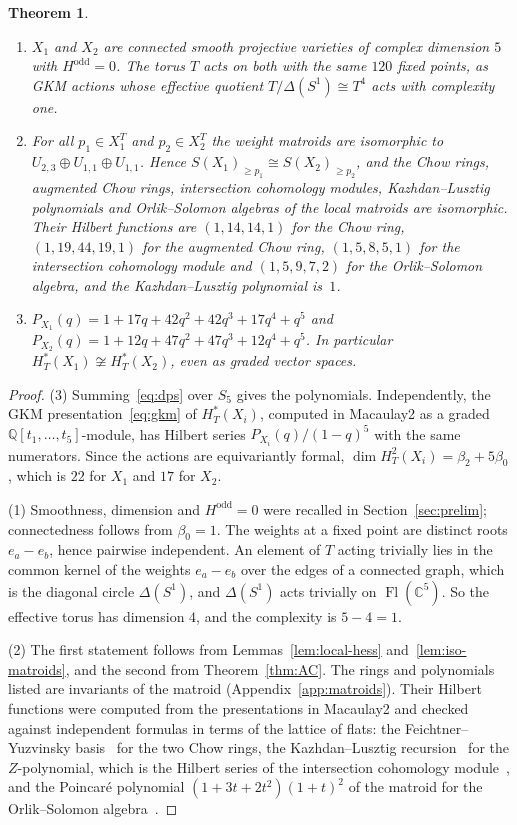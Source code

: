 \documentclass[11pt,a4paper]{article}
\numberwithin{equation}{section}
\theoremstyle{plain}
\newtheorem{theorem}{Theorem}[section]
\theoremstyle{definition}
\theoremstyle{remark}
\newcommand{\Q}{\mathbb{Q}}
\newcommand{\C}{\mathbb{C}}
\newcommand{\HT}{H^{*}_{T}}
\DeclareMathOperator{\Fl}{Fl}
\begin{document}
\begin{theorem}\label{thm:counterexample}
\begin{enumerate}[nosep,label=(\arabic*)]
\item $X_1$ and $X_2$ are connected smooth projective varieties of complex dimension $5$ with $H^{\mathrm{odd}}=0$. The torus $T$ acts on both with the same $120$ fixed points, as GKM actions whose effective quotient $T/\Delta(S^1)\cong T^4$ acts with complexity one.
\item For all $p_1\in X_1^T$ and $p_2\in X_2^T$ the weight matroids are isomorphic to $U_{2,3}\oplus U_{1,1}\oplus U_{1,1}$. Hence $S(X_1)_{\geqslant p_1}\cong S(X_2)_{\geqslant p_2}$, and the Chow rings, augmented Chow rings, intersection cohomology modules, Kazhdan--Lusztig polynomials and Orlik--Solomon algebras of the local matroids are isomorphic. Their Hilbert functions are $(1,14,14,1)$ for the Chow ring, $(1,19,44,19,1)$ for the augmented Chow ring, $(1,5,8,5,1)$ for the intersection cohomology module and $(1,5,9,7,2)$ for the Orlik--Solomon algebra, and the Kazhdan--Lusztig polynomial is~$1$.
\item $P_{X_1}(q)=1+17q+42q^2+42q^3+17q^4+q^5$ and $P_{X_2}(q)=1+12q+47q^2+47q^3+12q^4+q^5$. In particular $\HT(X_1)\not\cong\HT(X_2)$, even as graded vector spaces.
\end{enumerate}
\end{theorem}

\begin{proof}
(3) Summing~\eqref{eq:dps} over $S_5$ gives the polynomials. Independently, the GKM presentation~\eqref{eq:gkm} of $\HT(X_i)$, computed in Macaulay2 as a graded $\Q[t_1,\dots,t_5]$-module, has Hilbert series $P_{X_i}(q)/(1-q)^5$ with the same numerators. Since the actions are equivariantly formal, $\dim H^2_T(X_i)=\beta_2+5\beta_0$, which is $22$ for $X_1$ and $17$ for $X_2$.

(1) Smoothness, dimension and $H^{\mathrm{odd}}=0$ were recalled in Section~\ref{sec:prelim}; connectedness follows from $\beta_0=1$. The weights at a fixed point are distinct roots $e_a-e_b$, hence pairwise independent. An element of $T$ acting trivially lies in the common kernel of the weights $e_a-e_b$ over the edges of a connected graph, which is the diagonal circle $\Delta(S^1)$, and $\Delta(S^1)$ acts trivially on $\Fl(\C^5)$. So the effective torus has dimension $4$, and the complexity is $5-4=1$.

(2) The first statement follows from Lemmas~\ref{lem:local-hess} and~\ref{lem:iso-matroids}, and the second from Theorem~\ref{thm:AC}. The rings and polynomials listed are invariants of the matroid (Appendix~\ref{app:matroids}). Their Hilbert functions were computed from the presentations in Macaulay2 and checked against independent formulas in terms of the lattice of flats: the Feichtner--Yuzvinsky basis~\cite{FY04} for the two Chow rings, the Kazhdan--Lusztig recursion~\cite{EPW16} for the $Z$-polynomial, which is the Hilbert series of the intersection cohomology module~\cite{BHMPW26}, and the Poincaré polynomial $(1+3t+2t^2)(1+t)^2$ of the matroid for the Orlik--Solomon algebra~\cite{OT92}.
\end{proof}
\end{document}
